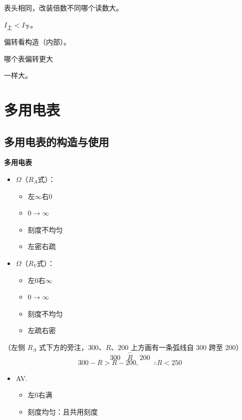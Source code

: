 
表头相同，改装倍数不同\quad 哪个读数大。

$I_{\text{上}}<I_{\text{下}}$。

偏转看构造（内部）。

哪个表偏转更大


一样大。


\section{多用电表}
\subsection{多用电表的构造与使用}
\textbf{多用电表}

\begin{itemize}
\item $\Omega$（$R_A$式）：
  \begin{itemize}
  \item 左$\infty$右$0$
  \item $0\to\infty$
  \item 刻度不均匀
  \item 左密右疏
  \end{itemize}
\item $\Omega$（$R_V$式）：
  \begin{itemize}
  \item 左$0$右$\infty$
  \item $0\to\infty$
  \item 刻度不均匀
  \item 左疏右密
  \end{itemize}
\end{itemize}

（左侧 $R_A$ 式下方的旁注，$300$、$R$、$200$ 上方画有一条弧线自 $300$ 跨至 $200$）
\[
\overset{\frown}{300\quad R\quad 200}
\]
\[
300-R>R-200,\qquad \therefore R<250
\]

\begin{itemize}
\item AV.
  \begin{itemize}
  \item 左$0$右满
  \item 刻度均匀：且共用刻度
  \end{itemize}
\end{itemize}

